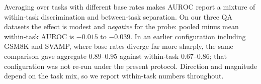 \documentclass[10pt]{article}
\begin{document}
Averaging over tasks with different base rates makes AUROC report a mixture of within-task
discrimination and between-task separation. On our three QA datasets the effect is modest and
\emph{negative} for the probe: pooled minus mean within-task AUROC is $-0.015$ to $-0.039$. In an
earlier configuration including GSM8K and SVAMP, where base rates diverge far more sharply, the same
comparison gave aggregate $0.89$--$0.95$ against within-task $0.67$--$0.86$; that configuration was
not re-run under the present protocol. Direction and magnitude depend on the task mix, so we report
within-task numbers throughout.

{\footnotesize
\setlength{\bibsep}{0pt plus 0.1ex}


}
\end{document}
